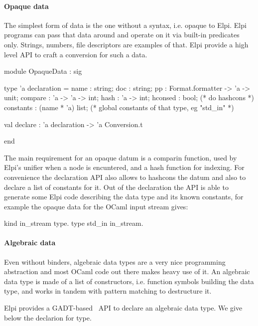 \documentclass[a4paper, 11pt]{book}
\begin{document}
\paragraph{Opaque data}

The simplest form of data is the one without a syntax, i.e. opaque to Elpi.
Elpi programs can pass that data around and operate on it via
built-in predicates only. Strings, numbers, file descriptors are examples
of that. Elpi provide a high level API to craft a conversion for such a data.

\begin{ocamlcode}
module OpaqueData : sig

  type 'a declaration = {
    name : string;
    doc : string;
    pp : Format.formatter -> 'a -> unit;
    compare : 'a -> 'a -> int;
    hash : 'a -> int;
    hconsed : bool;               (* do hashcons *)
    constants : (name * 'a) list; (* global constants of that type, eg "std_in" *)
  }

  val declare : 'a declaration -> 'a Conversion.t

end
\end{ocamlcode}

\noindent
The main requirement for an opaque datum is a comparin function, used by
Elpi's unifier when a  node is encuntered, and
a hash function for indexing. For convenience the declaration API also
allows to hashcons the datum and also to declare a list of constants for it.
Out of the declaration the API is able to generate some Elpi code
describing the data type and its known constants, for example the opaque data
for the OCaml input stream gives:

\begin{elpicode}
kind in_stream type.
type std_in in_stream.
\end{elpicode}

\paragraph{Algebraic data}

Even without binders, algebraic data types are a very nice programming
abstraction and most OCaml code out there makes heavy use of it.
An algebraic data type is made of a list of constructors, i.e. function
symbols building the data type, and works in tandem with pattern matching to
destructure it.

Elpi provides a GADT-based~\cite{SHEARD200849} API to declare an algebraic
data type. We give below the declarion for  type.
\end{document}
